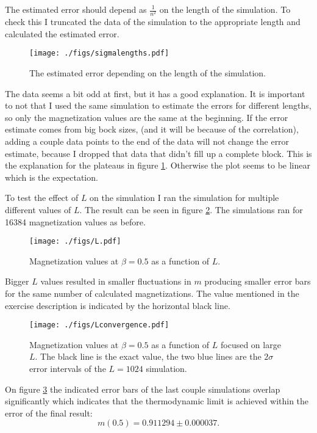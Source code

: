 \documentclass[pdftex,12pt,a4paper]{article}
\begin{document}
		The estimated error should depend as $\frac{1}{n^2}$ on the length of the simulation. To check this I truncated the data of the simulation to the appropriate length and calculated the estimated error.
		\begin{figure}[H]
			\centering
			\texttt{[image: ./figs/sigmalengths.pdf]}
			\caption{The estimated error depending on the length of the simulation.}
			\label{length}
		\end{figure}
		The data seems a bit odd at first, but it has a good explanation. It is important to not that I used the same simulation to estimate the errors for different lengths, so only the magnetization values are the same at the beginning. If the error estimate comes from big bock sizes, (and it will be because of the correlation), adding a couple data points to the end of the data will not change the error estimate, because I dropped that data that didn't fill up a complete block. This is the explanation for the plateaus in figure \ref{length}. Otherwise the plot seems to be linear which is the expectation.
		
		To test the effect of $L$ on the simulation I ran the simulation for multiple different values of $L$. The result can be seen in figure \ref{L}. The simulations ran for 16384 magnetization values as before.
		\begin{figure}[H]
			\centering
			\texttt{[image: ./figs/L.pdf]}
			\caption{Magnetization values at $\beta=0.5$ as a function of $L$.}
			\label{L}
		\end{figure}
		Bigger $L$ values resulted in smaller fluctuations in $m$ producing smaller error bars for the same number of calculated magnetizations. The value mentioned in the exercise description is indicated by the horizontal black line.
		\begin{figure}[H]
			\centering
			\texttt{[image: ./figs/Lconvergence.pdf]}
			\caption{Magnetization values at $\beta=0.5$ as a function of $L$ focused on large $L$. The black line is the exact value, the two blue lines are the $2\sigma$ error intervals of the $L=1024$ simulation.}
			\label{Lconergence}
		\end{figure}
		On figure \ref{Lconergence} the indicated error bars of the last couple simulations overlap significantly which indicates that the thermodynamic limit is achieved within the error of the final result:
		\begin{equation}
		m(0.5) = 0.911294 \pm 0.000037.
		\end{equation}
	
\end{document}
